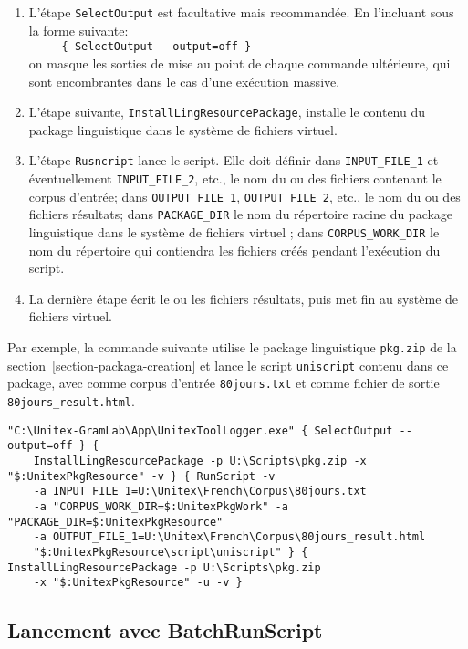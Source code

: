 \begin{enumerate}
\item L'étape \verb$SelectOutput$ est facultative mais recommandée. En l'incluant sous la forme
suivante:\\
\verb$     { SelectOutput --output=off }$\\
on masque les sorties de mise au point de chaque commande ultérieure, qui sont encombrantes
dans le cas d'une exécution massive.
\item L'étape suivante, \verb$InstallLingResourcePackage$, installe le contenu du package linguistique
dans le système de fichiers virtuel.
\item L'étape \verb$Rusncript$ lance le script. Elle doit définir dans  \verb$INPUT_FILE_1$ et
éventuellement \verb$INPUT_FILE_2$, etc., le nom du ou des fichiers contenant le corpus d'entrée; dans
\verb$OUTPUT_FILE_1$, \verb$OUTPUT_FILE_2$, etc., le nom du ou des fichiers résultats;
dans \verb$PACKAGE_DIR$ le nom du répertoire racine du package linguistique dans le système
de fichiers virtuel ; dans \verb$CORPUS_WORK_DIR$ le nom du répertoire qui contiendra les fichiers
créés pendant l'exécution du script.
\item La dernière étape écrit le ou les fichiers résultats, puis met fin au système de fichiers virtuel.
\end{enumerate}

\noindent Par exemple, la commande suivante utilise le package linguistique \verb$pkg.zip$ de la
section~\ref{section-packaga-creation} et lance
le script \verb$uniscript$ contenu dans ce package, avec comme corpus d'entrée \verb$80jours.txt$
et comme fichier de sortie \verb$80jours_result.html$.

\begin{Verbatim}[fontsize=\small,fontfamily=helvetica]
"C:\Unitex-GramLab\App\UnitexToolLogger.exe" { SelectOutput --output=off } {
    InstallLingResourcePackage -p U:\Scripts\pkg.zip -x "$:UnitexPkgResource" -v } { RunScript -v
    -a INPUT_FILE_1=U:\Unitex\French\Corpus\80jours.txt 
    -a "CORPUS_WORK_DIR=$:UnitexPkgWork" -a "PACKAGE_DIR=$:UnitexPkgResource"
    -a OUTPUT_FILE_1=U:\Unitex\French\Corpus\80jours_result.html 
    "$:UnitexPkgResource\script\uniscript" } { InstallLingResourcePackage -p U:\Scripts\pkg.zip 
    -x "$:UnitexPkgResource" -u -v }
\end{Verbatim}



\subsection{Lancement avec BatchRunScript}
\label{launch-script}

